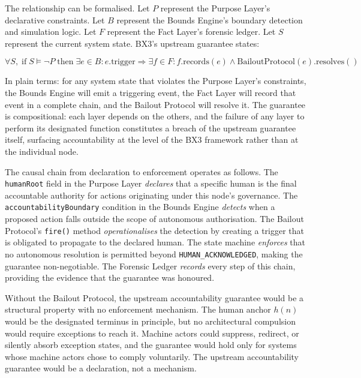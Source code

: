 The relationship can be formalised. Let $P$ represent the Purpose Layer's declarative constraints. Let $B$ represent the Bounds Engine's boundary detection and simulation logic. Let $F$ represent the Fact Layer's forensic ledger. Let $S$ represent the current system state. BX3's upstream guarantee states:

\begin{equation}
    \forall S,\; \text{if}\; S \models \neg P\; \text{then}\;
    \exists e \in B : e.\text{trigger} \Rightarrow
    \exists f \in F : f.\text{records}(e) \land \text{BailoutProtocol}(e).\text{resolves}()
\label{eq:upstream-guarantee}
\end{equation}

In plain terms: for any system state that violates the Purpose Layer's constraints, the Bounds Engine will emit a triggering event, the Fact Layer will record that event in a complete chain, and the Bailout Protocol will resolve it. The guarantee is compositional: each layer depends on the others, and the failure of any layer to perform its designated function constitutes a breach of the upstream guarantee itself, surfacing accountability at the level of the BX3 framework rather than at the individual node.

The causal chain from declaration to enforcement operates as follows. The \texttt{humanRoot} field in the Purpose Layer \emph{declares} that a specific human is the final accountable authority for actions originating under this node's governance. The \texttt{accountabilityBoundary} condition in the Bounds Engine \emph{detects} when a proposed action falls outside the scope of autonomous authorisation. The Bailout Protocol's \texttt{fire()} method \emph{operationalises} the detection by creating a trigger that is obligated to propagate to the declared human. The state machine \emph{enforces} that no autonomous resolution is permitted beyond \texttt{HUMAN\_ACKNOWLEDGED}, making the guarantee non-negotiable. The Forensic Ledger \emph{records} every step of this chain, providing the evidence that the guarantee was honoured.

Without the Bailout Protocol, the upstream accountability guarantee would be a structural property with no enforcement mechanism. The human anchor $h(n)$ would be the designated terminus in principle, but no architectural compulsion would require exceptions to reach it. Machine actors could suppress, redirect, or silently absorb exception states, and the guarantee would hold only for systems whose machine actors chose to comply voluntarily. The upstream accountability guarantee would be a declaration, not a mechanism.

